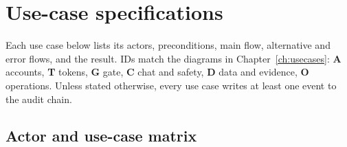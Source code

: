 \chapter{Use-case specifications}
\label{ch:specs}

Each use case below lists its actors, preconditions, main flow, alternative and error flows, and the result. IDs match the diagrams in Chapter~\ref{ch:usecases}: \textbf{A} accounts, \textbf{T} tokens, \textbf{G} gate, \textbf{C} chat and safety, \textbf{D} data and evidence, \textbf{O} operations. Unless stated otherwise, every use case writes at least one event to the audit chain.

\section{Actor and use-case matrix}

